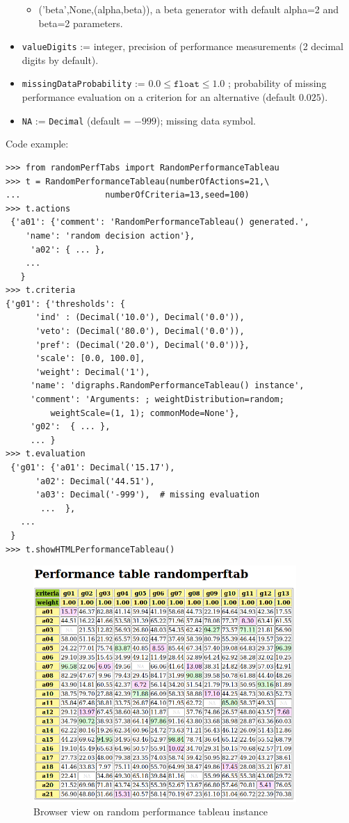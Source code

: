 \begin{itemize}
\begin{itemize}
         \item ('beta',None,(alpha,beta)), a beta generator with default alpha=2 and beta=2 parameters.
      \end{itemize}
\item \texttt{valueDigits} := integer, precision of performance measurements (2 decimal digits by default).
\item \texttt{missingDataProbability} := $0.0 \leq \mathtt{float} \leq 1.0$ ; probability of missing performance evaluation on a criterion for an alternative (default $0.025$).
\item \texttt{NA} := \texttt{Decimal} (default = $-999$); missing data symbol. 
\end{itemize} 

Code example:

\begin{lstlisting}[caption={Generating a random performance tableau},label=list:5.1,basicstyle=\footnotesize]
>>> from randomPerfTabs import RandomPerformanceTableau
>>> t = RandomPerformanceTableau(numberOfActions=21,\
...                 numberOfCriteria=13,seed=100)
>>> t.actions
 {'a01': {'comment': 'RandomPerformanceTableau() generated.',
	'name': 'random decision action'},
	 'a02': { ... },
    ...
   }
>>> t.criteria
{'g01': {'thresholds': {
      'ind' : (Decimal('10.0'), Decimal('0.0')),
      'veto': (Decimal('80.0'), Decimal('0.0')),
      'pref': (Decimal('20.0'), Decimal('0.0'))},
      'scale': [0.0, 100.0],
      'weight': Decimal('1'),
     'name': 'digraphs.RandomPerformanceTableau() instance',
     'comment': 'Arguments: ; weightDistribution=random;
         weightScale=(1, 1); commonMode=None'},
	 'g02':  { ... },
     ... }
>>> t.evaluation
 {'g01': {'a01': Decimal('15.17'),
      'a02': Decimal('44.51'),
      'a03': Decimal('-999'),  # missing evaluation
       ...  },
   ...
 }
>>> t.showHTMLPerformanceTableau()
 \end{lstlisting}

\begin{figure}[h]
\includegraphics[width=10cm]{Figures/randomPerfTab1.png}
\caption{Browser view on random performance tableau instance}
\label{fig:5.1}       %
\end{figure}

